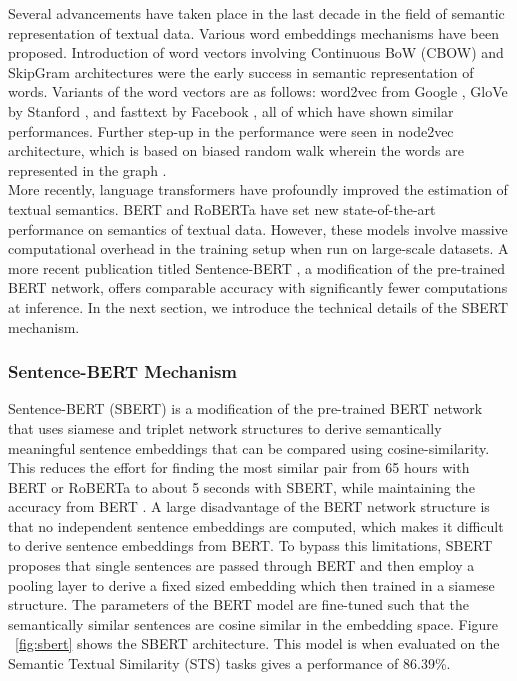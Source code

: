 \documentclass{kththesis}
\begin{document}
Several advancements have taken place in the last decade in the field of semantic representation of textual data. Various word embeddings mechanisms have been proposed. Introduction of word vectors involving Continuous BoW (CBOW) and SkipGram architectures \cite{skipgram} were the early success in semantic representation of words. Variants of the word vectors are as follows: word2vec from Google \cite{word2vec}, GloVe by Stanford \cite{glove}, and fasttext by Facebook \cite{fasttext}, all of which have shown similar performances. Further step-up in the performance were seen in node2vec architecture, which is based on biased random walk wherein the words are represented in the graph \cite{node2vec}.\\

More recently, language transformers have profoundly improved the estimation of textual semantics. BERT \cite{bert} and RoBERTa \cite{roberta} have set new state-of-the-art performance on semantics of textual data. However, these models involve massive computational overhead in the training setup when run on large-scale datasets. A more recent publication titled Sentence-BERT \cite{sbert}, a modification of the pre-trained BERT network, offers comparable accuracy with significantly fewer computations at inference. In the next section, we introduce the technical details of the SBERT mechanism. %

\subsubsection{Sentence-BERT Mechanism}
\noindent Sentence-BERT (SBERT) is a modification of the pre-trained BERT network that uses siamese and triplet network structures to derive semantically meaningful sentence embeddings that can be compared using cosine-similarity. This reduces the effort for finding the most similar pair from 65 hours with BERT or RoBERTa to about 5 seconds with SBERT, while maintaining the accuracy from BERT \cite{sbert}. A large disadvantage of the BERT network structure is that no independent sentence embeddings are computed, which makes it difficult to derive sentence embeddings from BERT. To bypass this limitations, SBERT proposes that single sentences are passed through BERT and then employ a pooling layer to derive a fixed sized embedding which then trained in a siamese structure. The parameters of the BERT model are fine-tuned such that the semantically similar sentences are cosine similar in the embedding space. Figure ~\ref{fig:sbert} shows the SBERT architecture. This model is when evaluated on the Semantic Textual Similarity (STS) tasks gives a performance of 86.39\%.
\end{document}
